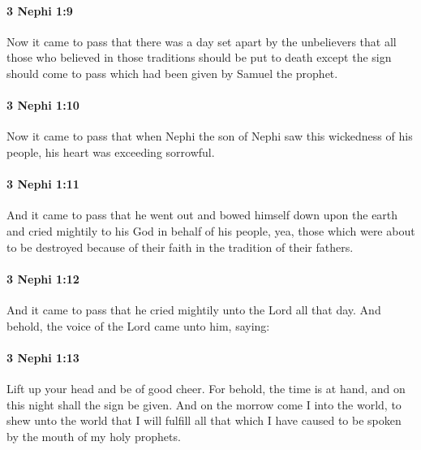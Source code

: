 		\paragraph{3 Nephi 1:9} %
			\label{3NEPHI-1-9}

			Now it came to pass that there was a day set apart by the unbelievers
			that all those who believed in those traditions should be put to death
			except the sign should come to pass which had been given by Samuel the prophet.

		\paragraph{3 Nephi 1:10} %
			\label{3NEPHI-1-10}

			Now it came to pass that
			when Nephi the son of Nephi saw this wickedness of his people,
			his heart was exceeding sorrowful.

		\paragraph{3 Nephi 1:11} %
			\label{3NEPHI-1-11}

			And it came to pass that he went out
			and bowed himself down upon the earth
			and cried mightily to his God in behalf of his people,
			yea, those which were about to be destroyed
			because of their faith in the tradition of their fathers.

		\paragraph{3 Nephi 1:12} %
			\label{3NEPHI-1-12}

			And it came to pass that he cried mightily unto the Lord all that day.
			And behold, the voice of the Lord came unto him, saying:

		\paragraph{3 Nephi 1:13} %
			\label{3NEPHI-1-13}

			Lift up your head and be of good cheer.
			For behold, the time is at hand,
			and on this night shall the sign be given.
			And on the morrow come I into the world,
			to shew unto the world that I will fulfill all that
			which I have caused to be spoken by the mouth of my holy prophets.

